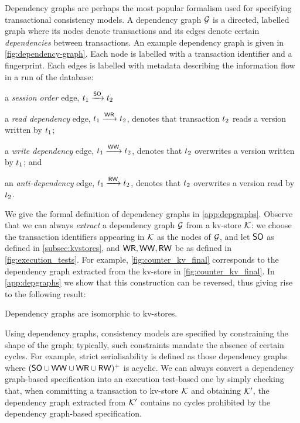 Dependency graphs \cite{adya-icde,adya} are perhaps the most popular 
formalism used for specifying transactional consistency models. 
A dependency graph $\mathcal{G}$ is a directed, labelled graph where its
nodes denote transactions and its edges denote certain \emph{dependencies} between transactions.  
An example dependency graph is given in \cref{fig:dependency-graph}.
Each node is labelled with a transaction identifier and a fingerprint.
Each edges is labelled with metadata describing the information flow in a run of the database: 
\begin{enumerate*}
    \item a \emph{session order} edge, $t_1 \xrightarrow{\mathsf{SO}} t_2$
	\item a \emph{read dependency} edge, $t_1 \xrightarrow{\mathsf{WR}} t_2$, denotes
that transaction $t_2$ reads a version written by $t_1$;
	\item a \emph{write dependency} edge, $t_1 \xrightarrow{\mathsf{WW}} t_2$, denotes that $t_2$ overwrites a version written by $t_1$; and 
	\item an \emph{anti-dependency} edge, $t_1 \xrightarrow{\mathsf{RW}} t_2$, denotes that $t_2$ overwrites a version read by $t_2$. 
\end{enumerate*}
We give the formal definition of dependency graphs in \cref{app:depgraphs}.
Observe that we can always \emph{extract} a dependency graph  $\mathcal{G}$ from a kv-store $\mathcal{K}$:
we choose the transaction identifiers appearing in $\mathcal{K}$ as the nodes of $\mathcal{G}$, 
and let $\mathsf{SO}$ as defined in \cref{subsec:kvstores}, and $ \mathsf{WR}, \mathsf{WW}, \mathsf{RW}$  
be as defined in \cref{fig:execution_tests}.
For example, \cref{fig:counter_kv_final} corresponds to the dependency graph extracted from the kv-store in \cref{fig:counter_kv_final}.
In \cref{app:depgraphs} we show that this construction can be reversed, thus giving 
rise to the following result: 
\begin{theorem}
\label{thm:kv_graph_isomorph}
Dependency graphs are isomorphic to kv-stores.
\end{theorem}

Using dependency graphs, consistency models are specified by constraining the shape of the graph; typically, such constraints mandate the absence of certain cycles. For example, strict serialisability is defined as those dependency graphs where $(\mathsf{SO} \cup \mathsf{WW} \cup \mathsf{WR} \cup \mathsf{RW})^+$ is acyclic. 
We can always convert a dependency graph-based specification into an execution test-based one by simply checking that, when committing a transaction to kv-store $\mathcal{K}$ and obtaining $\mathcal{K}'$, 
the dependency graph extracted from $\mathcal{K}'$ contains no cycles prohibited by the dependency graph-based specification. 

